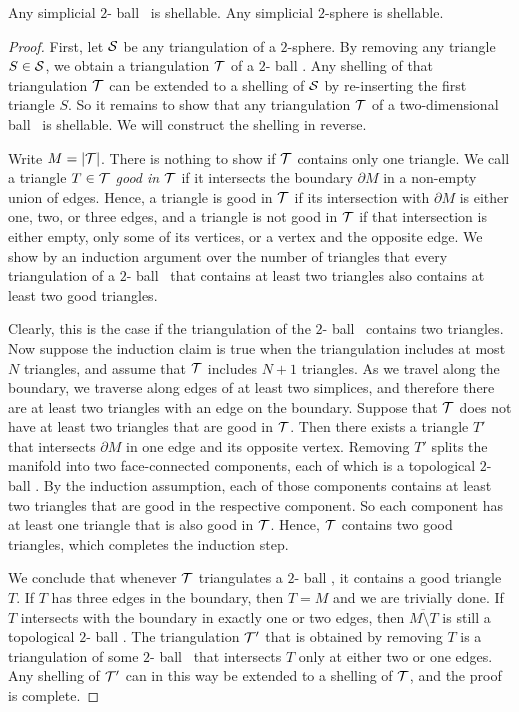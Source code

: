 \documentclass[10pt,a4paper]{article}
\newcommand\cye[1]{%
\protect\leavevmode
\begingroup
    \color{blue}%
    #1%
\endgroup
}
\newcommand{\disk}{\cye{ball}}
\begin{document}
\begin{lemma}\label{lemma:shell_2D}
    Any simplicial $2$-\disk\ is shellable.
    Any simplicial $2$-sphere is shellable. 
\end{lemma}
\begin{proof}
    First, 
    let ${\mathcal S}$ be any triangulation of a $2$-sphere. 
    By removing any triangle $S \in {\mathcal S}$, we obtain a triangulation ${\mathcal T}$ of a $2$-\disk.
    Any shelling of that triangulation ${\mathcal T}$ can be extended to a shelling of ${\mathcal S}$ by re-inserting the first triangle $S$.
    So it remains to show that any triangulation ${\mathcal T}$ of a two-dimensional \disk\ is shellable. 
    We will construct the shelling in reverse. 
    
    Write $M = \left| {\mathcal T} \right|$. 
    There is nothing to show if ${\mathcal T}$ contains only one triangle. 
    We call a triangle $T \in {\mathcal T}$ \emph{good in ${\mathcal T}$} if it intersects the boundary $\partial M$ in a non-empty union of edges. 
    Hence, a triangle is good in ${\mathcal T}$ if its intersection with $\partial M$ is either one, two, or three edges,
    and a triangle is not good in ${\mathcal T}$ if that intersection is either empty, only some of its vertices, or a vertex and the opposite edge.
    We show by an induction argument over the number of triangles that every triangulation of a $2$-\disk\ that contains at least two triangles also contains at least two good triangles. 

    Clearly, this is the case if the triangulation of the $2$-\disk\ contains two triangles. 
    Now suppose the induction claim is true when the triangulation includes at most $N$ triangles,
    and assume that ${\mathcal T}$ includes $N+1$ triangles. 
    As we travel along the boundary, we traverse along edges of at least two simplices, 
    and therefore there are at least two triangles with an edge on the boundary. 
    Suppose that ${\mathcal T}$ does not have at least two triangles that are good in ${\mathcal T}$.
    Then there exists a triangle $T'$ that intersects $\partial M$ 
    in one edge and its opposite vertex.
    Removing $T'$ splits the manifold into two face-connected components, each of which is a topological $2$-\disk. 
    By the induction assumption, each of those components contains at least two triangles 
    that are good in the respective component. 
    So each component has at least one triangle that is also good in ${\mathcal T}$. 
    Hence, ${\mathcal T}$ contains two good triangles, which completes the induction step. 
    
    We conclude that whenever ${\mathcal T}$ triangulates a $2$-\disk,
    it contains a good triangle $T$. 
    If $T$ has three edges in the boundary, then $T = M$ and we are trivially done. 
    If $T$ intersects with the boundary in exactly one or two edges, 
    then $\overline{M \setminus T}$ is still a topological $2$-\disk.
    The triangulation ${\mathcal T}'$ that is obtained by removing $T$
    is a triangulation of some $2$-\disk\ that intersects $T$ only at either two or one edges.
    Any shelling of ${\mathcal T}'$ can in this way be extended to a shelling of ${\mathcal T}$, and the proof is complete. 
\end{proof}
\end{document}
